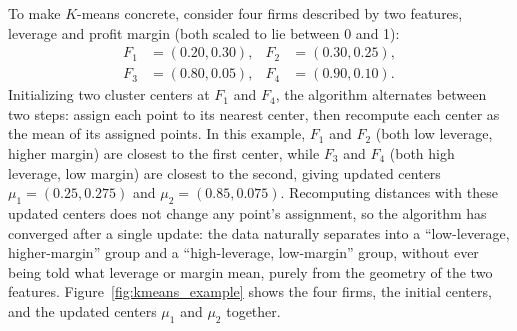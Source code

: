 \documentclass[../ai_in_finance]{subfiles}
\begin{document}
To make $K$-means concrete, consider four firms described by two features, leverage and profit margin (both scaled to lie between 0 and 1):
\begin{align*}
F_1 &= (0.20, 0.30), & F_2 &= (0.30, 0.25), \\
F_3 &= (0.80, 0.05), & F_4 &= (0.90, 0.10).
\end{align*}
Initializing two cluster centers at $F_1$ and $F_4$, the algorithm alternates between two steps: assign each point to its nearest center, then recompute each center as the mean of its assigned points. In this example, $F_1$ and $F_2$ (both low leverage, higher margin) are closest to the first center, while $F_3$ and $F_4$ (both high leverage, low margin) are closest to the second, giving updated centers $\mu_1 = (0.25, 0.275)$ and $\mu_2 = (0.85, 0.075)$. Recomputing distances with these updated centers does not change any point's assignment, so the algorithm has converged after a single update: the data naturally separates into a ``low-leverage, higher-margin'' group and a ``high-leverage, low-margin'' group, without ever being told what leverage or margin mean, purely from the geometry of the two features. Figure~\ref{fig:kmeans_example} shows the four firms, the initial centers, and the updated centers $\mu_1$ and $\mu_2$ together.
\end{document}
